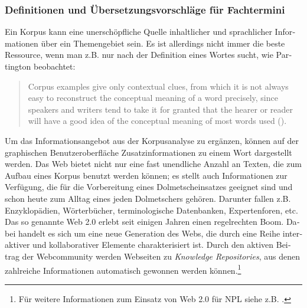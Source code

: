 \documentclass[output=paper]{LSP/langsci}
\begin{document}
\begin{otherlanguage}{ngerman}
\subsubsection{Definitionen und Übersetzungsvorschläge für Fachtermini}\label{sec:fantinuoli:6.1.4}

Ein Korpus kann eine unerschöpfliche Quelle inhaltlicher und sprachlicher Informationen über ein Themengebiet sein. Es ist allerdings nicht immer die beste Ressource, wenn man z.B. nur nach der Definition eines Wortes sucht, wie Partington beobachtet:

\begin{quote}
Corpus examples give only contextual clues, from which it is not always easy to reconstruct the conceptual meaning of a word precisely, since speakers and writers tend to take it for granted that the hearer or reader will have a good idea of the conceptual meaning of most words used (\citeyear[64]{Partington2001}).
\end{quote}

Um das Informationsangebot aus der Korpusanalyse zu ergänzen, können auf der graphischen Benutzeroberfläche Zusatzinformationen zu einem Wort dargestellt werden. Das Web bietet nicht nur eine fast unendliche Anzahl an Texten, die zum Aufbau eines Korpus benutzt werden können; es stellt auch Informationen zur Verfügung, die für die Vorbereitung eines Dolmetscheinsatzes geeignet sind und schon heute zum Alltag eines jeden Dolmetschers gehören. Darunter fallen z.B. Enzyklopädien, Wörterbücher, terminologische Datenbanken, Expertenforen, etc. Das so genannte Web 2.0 erlebt seit einigen Jahren einen regelrechten Boom. Dabei handelt es sich um eine neue Generation des Webs, die durch eine Reihe interaktiver und kollaborativer Elemente charakterisiert ist. Durch den aktiven Beitrag der Webcommunity werden Webseiten zu \textit{Knowledge Repositories}, aus denen zahlreiche Informationen automatisch gewonnen werden können.\footnote{Für weitere Informationen zum Einsatz von Web 2.0 für NPL siehe z.B. \citep{Frank2008}.}


\end{otherlanguage}
\end{document}
